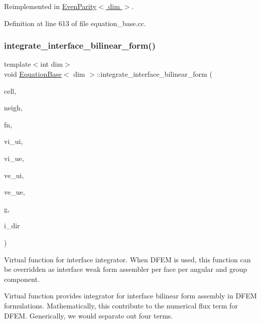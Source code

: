 Reimplemented in \hyperlink{class_even_parity_adc8fad33adf1fae4fb59268b365b21f9}{Even\+Parity$<$ dim $>$}.



Definition at line 613 of file equation\+\_\+base.\+cc.

\mbox{\label{class_equation_base_af56caa04c80d8f388e116307930d0063}} 
\subsubsection{\texorpdfstring{integrate\+\_\+interface\+\_\+bilinear\+\_\+form()}{integrate\_interface\_bilinear\_form()}}
{\footnotesize\ttfamily template$<$int dim$>$ \\
void \hyperlink{class_equation_base}{Equation\+Base}$<$ dim $>$\+::integrate\+\_\+interface\+\_\+bilinear\+\_\+form (\begin{DoxyParamCaption}\item[{typename Do\+F\+Handler$<$ dim $>$\+::active\+\_\+cell\+\_\+iterator \&}]{cell,  }\item[{typename Do\+F\+Handler$<$ dim $>$\+::cell\+\_\+iterator \&}]{neigh,  }\item[{unsigned int \&}]{fn,  }\item[{Full\+Matrix$<$ double $>$ \&}]{vi\+\_\+ui,  }\item[{Full\+Matrix$<$ double $>$ \&}]{vi\+\_\+ue,  }\item[{Full\+Matrix$<$ double $>$ \&}]{ve\+\_\+ui,  }\item[{Full\+Matrix$<$ double $>$ \&}]{ve\+\_\+ue,  }\item[{const unsigned int \&}]{g,  }\item[{const unsigned int \&}]{i\+\_\+dir }\end{DoxyParamCaption})\hspace{0.3cm}{\ttfamily [virtual]}}



Virtual function for interface integrator. When D\+F\+EM is used, this function can be overridden as interface weak form assembler per face per angular and group component. 

Virtual function provides integrator for interface bilinear form assembly in D\+F\+EM formulations. Mathematically, this contribute to the numerical flux term for D\+F\+EM. Generically, we would separate out four terms.


